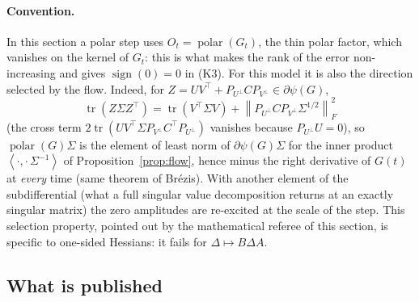 \documentclass[11pt]{article}
\theoremstyle{definition}
\theoremstyle{remark}
\newcommand{\nF}[1]{\left\|#1\right\|_{F}}
\newcommand{\inner}[2]{\left\langle #1, #2 \right\rangle}
\newcommand{\tr}{\operatorname{tr}}
\newcommand{\polar}{\operatorname{polar}}
\newcommand{\sign}{\operatorname{sign}}
\begin{document}
\paragraph{Convention.} In this section a polar step uses $O_t=\polar(G_t)$, the thin polar factor, which vanishes on
the kernel of $G_t$: this is what makes the rank of the error non-increasing and gives $\sign(0)=0$ in (K3). For this
model it is also the direction selected by the flow. Indeed, for $Z=UV^\top+P_{U^\perp}CP_{V^\perp}\in\partial\psi(G)$,
\[
\tr(Z\Sigma Z^\top)=\tr(V^\top\Sigma V)+\nF{P_{U^\perp}CP_{V^\perp}\Sigma^{1/2}}^2
\]
(the cross term $2\tr(UV^\top\Sigma P_{V^\perp}C^\top P_{U^\perp})$ vanishes because $P_{U^\perp}U=0$), so $\polar(G)\Sigma$
is the element of least norm of $\partial\psi(G)\Sigma$ for the inner product $\inner{\cdot}{\cdot\,\Sigma^{-1}}$ of
Proposition~\ref{prop:flow}, hence minus the right derivative of $G(t)$ at \emph{every} time (same theorem of Br\'ezis).
With another element of the subdifferential (what a full singular value decomposition returns at an exactly singular
matrix) the zero amplitudes are re-excited at the scale of the step. This selection property, pointed out by the
mathematical referee of this section, is specific to one-sided Hessians: it fails for $\Delta\mapsto B\Delta A$.

\subsection{What is published}\label{sec:ls-known}
\end{document}
